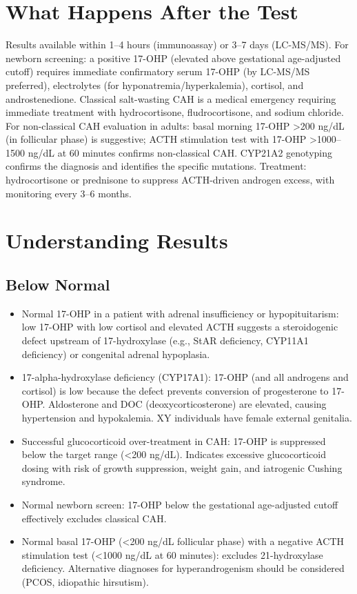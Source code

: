 \section*{What Happens After the Test}
Results available within 1--4 hours (immunoassay) or 3--7 days (LC-MS/MS). For newborn screening: a positive 17-OHP (elevated above gestational age-adjusted cutoff) requires immediate confirmatory serum 17-OHP (by LC-MS/MS preferred), electrolytes (for hyponatremia/hyperkalemia), cortisol, and androstenedione. Classical salt-wasting CAH is a medical emergency requiring immediate treatment with hydrocortisone, fludrocortisone, and sodium chloride. For non-classical CAH evaluation in adults: basal morning 17-OHP >200 ng/dL (in follicular phase) is suggestive; ACTH stimulation test with 17-OHP >1000--1500 ng/dL at 60 minutes confirms non-classical CAH. CYP21A2 genotyping confirms the diagnosis and identifies the specific mutations. Treatment: hydrocortisone or prednisone to suppress ACTH-driven androgen excess, with monitoring every 3--6 months.

\section*{Understanding Results}

\subsection*{Below Normal}
\begin{itemize}
  \item Normal 17-OHP in a patient with adrenal insufficiency or hypopituitarism: low 17-OHP with low cortisol and elevated ACTH suggests a steroidogenic defect upstream of 17-hydroxylase (e.g., StAR deficiency, CYP11A1 deficiency) or congenital adrenal hypoplasia.
  \item 17-alpha-hydroxylase deficiency (CYP17A1): 17-OHP (and all androgens and cortisol) is low because the defect prevents conversion of progesterone to 17-OHP. Aldosterone and DOC (deoxycorticosterone) are elevated, causing hypertension and hypokalemia. XY individuals have female external genitalia.
  \item Successful glucocorticoid over-treatment in CAH: 17-OHP is suppressed below the target range (<200 ng/dL). Indicates excessive glucocorticoid dosing with risk of growth suppression, weight gain, and iatrogenic Cushing syndrome.
  \item Normal newborn screen: 17-OHP below the gestational age-adjusted cutoff effectively excludes classical CAH.
  \item Normal basal 17-OHP (<200 ng/dL follicular phase) with a negative ACTH stimulation test (<1000 ng/dL at 60 minutes): excludes 21-hydroxylase deficiency. Alternative diagnoses for hyperandrogenism should be considered (PCOS, idiopathic hirsutism).
\end{itemize}

